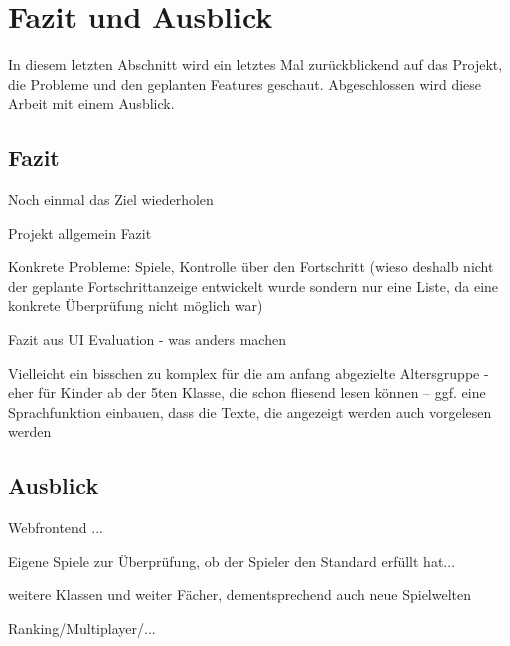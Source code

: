 \chapter{Fazit und Ausblick}
	In diesem letzten Abschnitt wird ein letztes Mal zurückblickend auf das Projekt, die Probleme und den geplanten Features geschaut. Abgeschlossen wird diese Arbeit mit einem Ausblick. 
	
	\section{Fazit}
		Noch einmal das Ziel wiederholen 
	
		Projekt allgemein Fazit
		
		Konkrete Probleme: Spiele, Kontrolle über den Fortschritt (wieso deshalb nicht der geplante Fortschrittanzeige entwickelt wurde sondern nur eine Liste, da eine konkrete Überprüfung nicht möglich war)
		
		Fazit aus UI Evaluation - was anders machen
		
		Vielleicht ein bisschen zu komplex für die am anfang abgezielte Altersgruppe - eher für Kinder ab der 5ten Klasse, die schon fliesend lesen können -- ggf. eine Sprachfunktion einbauen, dass die Texte, die angezeigt werden auch vorgelesen werden
		
		

	\section{Ausblick}
		Webfrontend ...
		
		Eigene Spiele zur Überprüfung, ob der Spieler den Standard erfüllt hat...
		
		weitere Klassen und weiter Fächer, dementsprechend auch neue Spielwelten
		
		Ranking/Multiplayer/...